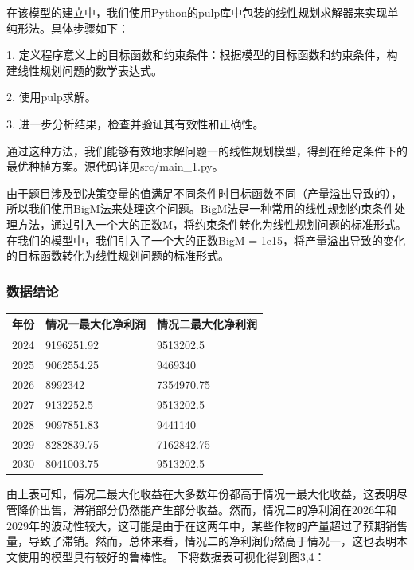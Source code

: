 \documentclass[withoutpreface]{cumcmthesis}
\begin{document}
在该模型的建立中，我们使用Python的pulp库中包装的线性规划求解器来实现单纯形法。具体步骤如下：

1. 定义程序意义上的目标函数和约束条件：根据模型的目标函数和约束条件，构建线性规划问题的数学表达式。

2. 使用pulp求解。

3. 进一步分析结果，检查并验证其有效性和正确性。

通过这种方法，我们能够有效地求解问题一的线性规划模型，得到在给定条件下的最优种植方案。源代码详见src/main\_1.py。

由于题目涉及到决策变量的值满足不同条件时目标函数不同（产量溢出导致的），所以我们使用BigM法来处理这个问题。BigM法是一种常用的线性规划约束条件处理方法，通过引入一个大的正数M，将约束条件转化为线性规划问题的标准形式。在我们的模型中，我们引入了一个大的正数BigM = 1e15，将产量溢出导致的变化的目标函数转化为线性规划问题的标准形式。

\subsubsection{数据结论}

\begin{table}[H]
    \centering
    \begin{tabular}{|l|l|l|}
    \hline
    \textbf{年份} & \textbf{情况一最大化净利润} & \textbf{情况二最大化净利润}  \\ \hline
        2024 & 9196251.92 & 9513202.5
        \\ \hline
        2025 & 9062554.25 & 9469340
        \\ \hline
        2026 & 8992342 & 7354970.75
        \\ \hline
        2027 & 9132252.5 & 9513202.5
        \\ \hline
        2028 & 9097851.83 & 9441140
        \\ \hline
        2029 & 8282839.75 & 7162842.75
        \\ \hline
        2030 & 8041003.75 & 9513202.5
        \\ \hline


    \end{tabular}
\end{table}
由上表可知，情况二最大化收益在大多数年份都高于情况一最大化收益，这表明尽管降价出售，滞销部分仍然能产生部分收益。然而，情况二的净利润在2026年和2029年的波动性较大，这可能是由于在这两年中，某些作物的产量超过了预期销售量，导致了滞销。然而，总体来看，情况二的净利润仍然高于情况一，这也表明本文使用的模型具有较好的鲁棒性。
下将数据表可视化得到图3,4：
\end{document}
